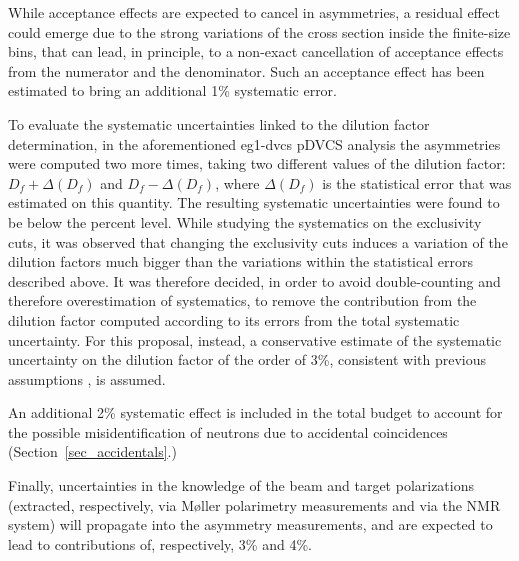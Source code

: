 While acceptance effects are expected to cancel in asymmetries, a residual effect could emerge due to the strong variations of the cross section inside the finite-size bins, that can lead, in principle, to a non-exact cancellation of acceptance effects from the numerator and the denominator. Such an acceptance effect has been estimated to bring an additional 1\% systematic error. 

To evaluate the systematic uncertainties linked to the dilution factor determination, in the aforementioned eg1-dvcs pDVCS analysis the  asymmetries were computed two more times, taking two different values of the dilution factor: $D_f+\Delta(D_f)$ and $D_f-\Delta(D_f)$, where $\Delta(D_f)$ is the statistical error that was estimated on this quantity. The resulting systematic uncertainties were found to be below the percent level. While studying the systematics on the exclusivity cuts, it was observed that changing the exclusivity cuts induces a variation of the dilution factors much bigger than the variations within the statistical errors described above. It was therefore decided, in order to avoid double-counting and therefore overestimation of systematics, to remove the contribution from the dilution factor computed according to its errors from the total systematic uncertainty. For this proposal, instead, a conservative estimate of the systematic uncertainty on the dilution factor of the order of 3\%, consistent with previous assumptions \cite{kuhn}, is assumed. 


An additional 2\% systematic effect is included in the total budget to account for the possible misidentification of neutrons due to accidental coincidences (Section~\ref{sec_accidentals}.)

Finally, uncertainties in the knowledge of the beam and target polarizations (extracted, respectively, via M{\o}ller polarimetry measurements and via the NMR system) will propagate into the asymmetry measurements, and are expected to lead to contributions of, respectively, 3\% and 4\%.

